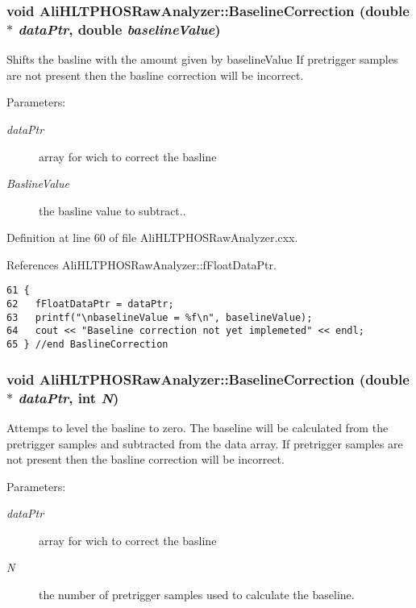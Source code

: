 \subsubsection{\setlength{\rightskip}{0pt plus 5cm}void Ali\-HLTPHOSRaw\-Analyzer::Baseline\-Correction (double $\ast$ {\em data\-Ptr}, double {\em baseline\-Value})\hspace{0.3cm}{\tt  [inherited]}}\label{classAliHLTPHOSRawAnalyzer_AliHLTPHOSRawAnalyzerPeakFindera8}


Shifts the basline with the amount given by baseline\-Value If pretrigger samples are not present then the basline correction will be incorrect. \begin{Desc}
\item[Parameters:]
\begin{description}
\item[{\em data\-Ptr}]array for wich to correct the basline \item[{\em Basline\-Value}]the basline value to subtract.. \end{description}
\end{Desc}


Definition at line 60 of file Ali\-HLTPHOSRaw\-Analyzer.cxx.

References Ali\-HLTPHOSRaw\-Analyzer::f\-Float\-Data\-Ptr.

\footnotesize\begin{verbatim}61 {
62   fFloatDataPtr = dataPtr;   
63   printf("\nbaselineValue = %f\n", baselineValue);
64   cout << "Baseline correction not yet implemeted" << endl;
65 } //end BaslineCorrection
\end{verbatim}\normalsize 


\subsubsection{\setlength{\rightskip}{0pt plus 5cm}void Ali\-HLTPHOSRaw\-Analyzer::Baseline\-Correction (double $\ast$ {\em data\-Ptr}, int {\em N})\hspace{0.3cm}{\tt  [inherited]}}\label{classAliHLTPHOSRawAnalyzer_AliHLTPHOSRawAnalyzerPeakFindera7}


Attemps to level the basline to zero. The baseline will be calculated from the pretrigger samples and subtracted from the data array. If pretrigger samples are not present then the basline correction will be incorrect. \begin{Desc}
\item[Parameters:]
\begin{description}
\item[{\em data\-Ptr}]array for wich to correct the basline \item[{\em N}]the number of pretrigger samples used to calculate the baseline. \end{description}
\end{Desc}


